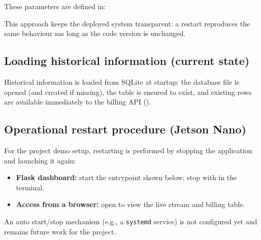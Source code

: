 \noindent
These parameters are defined in:\par
{\raggedright
	\par}

\noindent
This approach keeps the deployed system transparent: a restart reproduces the same behaviour sas long as the code version is unchanged.




\subsection{Loading historical information (current state)}

\noindent
Historical information is loaded from SQLite at startup: the database file is opened (and created if missing), the  table is ensured to exist, and existing rows are available immediately to the billing API ().

\subsection{Operational restart procedure (Jetson Nano)}

\noindent
For the project demo setup, restarting is performed by stopping the application and launching it again:
\begin{itemize}
	\item \textbf{Flask dashboard:} start the entrypoint shown below; stop with  in the terminal.
	
	\noindent{}
	
	\item \textbf{Access from a browser:} open  to view the live stream and billing table.
\end{itemize}


\noindent
An auto start/stop mechanism (e.g., a \texttt{systemd} service) is not configured yet and remains future work for the project.
